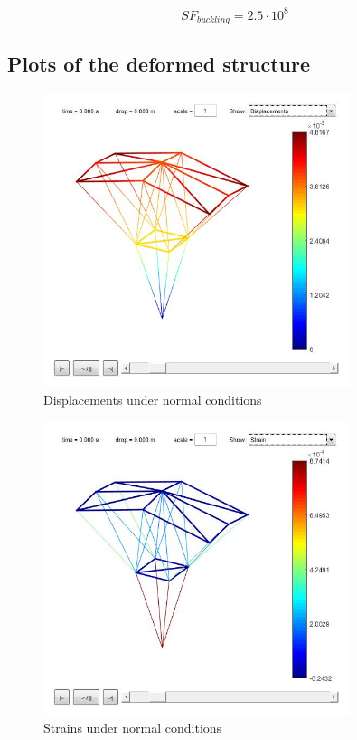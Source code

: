 \begin{equation}
	\boxed{SF_{buckling} = 2.5\cdot10^8}
\end{equation}

\newpage
\subsection{Plots of the deformed structure}

\begin{figure}[h]
	\centering
	\includegraphics[width=0.8\textwidth]{img/displacements1.jpg}
	\caption{Displacements under normal conditions}
	\label{fig:displacements}
\end{figure}

\begin{figure}[h]
	\centering
	\includegraphics[width=0.8\textwidth]{img/strain1.jpg}
	\caption{Strains under normal conditions}
	\label{fig:strain}
\end{figure}

